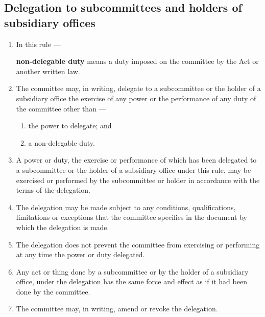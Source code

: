 \documentclass[../constitution.tex]{subfiles}
\begin{document}
\hypertarget{delegation-to-subcommittees-and-holders-of-subsidiary-offices}{%
\subsection{Delegation to subcommittees and holders of subsidiary offices}\label{delegation-to-subcommittees-and-holders-of-subsidiary-offices}}

\begin{enumerate}

\item In this rule ---

\textbf{non-delegable duty} means a duty imposed on the committee by the Act or another written law.

\item The committee may, in writing, delegate to a subcommittee or the holder of a subsidiary office the exercise of any power or the performance of any duty of the committee other than ---

  \begin{enumerate}
  
  \item the power to delegate; and
  \item a non-delegable duty.
  \end{enumerate}
\item A power or duty, the exercise or performance of which has been delegated to a subcommittee or the holder of a subsidiary office under this rule, may be exercised or performed by the subcommittee or holder in accordance with the terms of the delegation.
\item The delegation may be made subject to any conditions, qualifications, limitations or exceptions that the committee specifies in the document by which the delegation is made.
\item The delegation does not prevent the committee from exercising or performing at any time the power or duty delegated.
\item Any act or thing done by a subcommittee or by the holder of a subsidiary office, under the delegation has the same force and effect as if it had been done by the committee.
\item The committee may, in writing, amend or revoke the delegation.
\end{enumerate}
\end{document}
